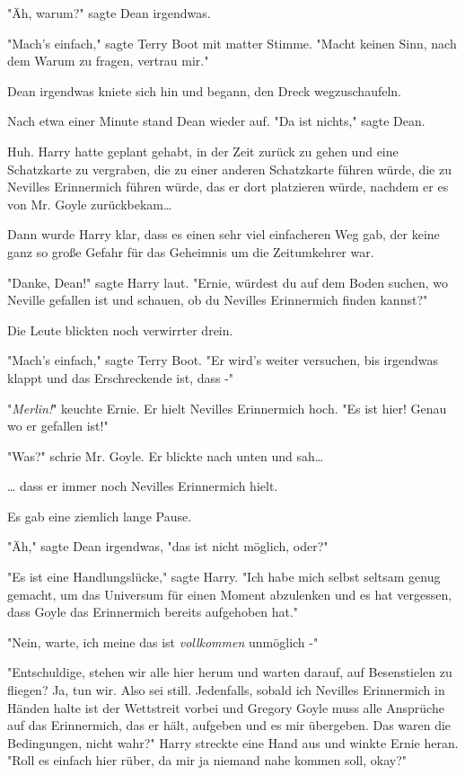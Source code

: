 {"Äh, warum?" sagte Dean irgendwas.

"Mach's einfach," sagte Terry Boot mit matter Stimme. "Macht keinen Sinn, nach dem Warum zu fragen, vertrau mir."

Dean irgendwas kniete sich hin und begann, den Dreck wegzuschaufeln.

Nach etwa einer Minute stand Dean wieder auf. "Da ist nichts," sagte Dean.

Huh. Harry hatte geplant gehabt, in der Zeit zurück zu gehen und eine Schatzkarte zu vergraben, die zu einer anderen Schatzkarte führen würde, die zu Nevilles Erinnermich führen würde, das er dort platzieren würde, nachdem er es von Mr. Goyle zurückbekam…

Dann wurde Harry klar, dass es einen sehr viel einfacheren Weg gab, der keine ganz so große Gefahr für das Geheimnis um die Zeitumkehrer war.

"Danke, Dean!" sagte Harry laut. "Ernie, würdest du auf dem Boden suchen, wo Neville gefallen ist und schauen, ob du Nevilles Erinnermich finden kannst?"

Die Leute blickten noch verwirrter drein.

"Mach's einfach," sagte Terry Boot. "Er wird's weiter versuchen, bis irgendwas klappt und das Erschreckende ist, dass -"

"\emph{Merlin!}" keuchte Ernie. Er hielt Nevilles Erinnermich hoch. "Es ist hier! Genau wo er gefallen ist!"

"Was?" schrie Mr. Goyle. Er blickte nach unten und sah…

… dass er immer noch Nevilles Erinnermich hielt.

Es gab eine ziemlich lange Pause.

"Äh," sagte Dean irgendwas, "das ist nicht möglich, oder?"

"Es ist eine Handlungslücke," sagte Harry. "Ich habe mich selbst seltsam genug gemacht, um das Universum für einen Moment abzulenken und es hat vergessen, dass Goyle das Erinnermich bereits aufgehoben hat."

"Nein, warte, ich meine das ist \emph{vollkommen} unmöglich -"

"Entschuldige, stehen wir alle hier herum und warten darauf, auf Besenstielen zu fliegen? Ja, tun wir. Also sei still. Jedenfalls, sobald ich Nevilles Erinnermich in Händen halte ist der Wettstreit vorbei und Gregory Goyle muss alle Ansprüche auf das Erinnermich, das er hält, aufgeben und es mir übergeben. Das waren die Bedingungen, nicht wahr?" Harry streckte eine Hand aus und winkte Ernie heran. "Roll es einfach hier rüber, da mir ja niemand nahe kommen soll, okay?"

}
